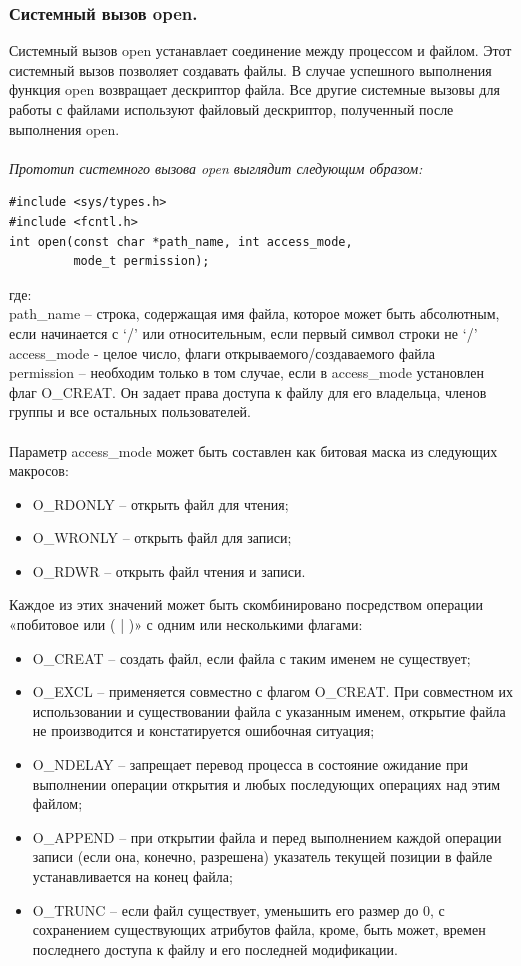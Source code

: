 \documentclass[a4paper]{article}
\begin{document}
\subsubsection{\Large Системный вызов open.}
Системный вызов open устанавлает соединение между процессом и файлом. Этот системный вызов позволяет создавать файлы. В случае успешного выполнения функция open возвращает дескриптор файла. Все другие системные вызовы для работы с файлами используют файловый дескриптор, полученный после выполнения open.\\\\
\sl Прототип системного вызова open выглядит следующим образом:
\begin{verbatim}
#include <sys/types.h>
#include <fcntl.h>
int open(const char *path_name, int access_mode, 
         mode_t permission);
\end{verbatim}
\rm где:\\
path\_name – строка, содержащая имя файла, которое может быть абсолютным, если начинается с ‘/’ или относительным, если первый символ строки
не ‘/’\\
access\_mode - целое число, флаги открываемого/создаваемого файла \\
permission – необходим только в том случае, если в access\_mode установлен флаг O\_CREAT. Он задает права доступа к файлу для его владельца, членов группы и все остальных пользователей.\\\\
Параметр access\_mode может быть составлен как битовая маска из следующих макросов:
\begin{itemize}
  \item O\_RDONLY – открыть файл для чтения;
  \item O\_WRONLY – открыть файл для записи;
  \item O\_RDWR – открыть файл чтения и записи.
\end{itemize}

Каждое из этих значений может быть скомбинировано посредством операции «побитовое или ( | )» с одним или несколькими флагами:
\begin{itemize}
  \item O\_CREAT – создать файл, если файла с таким именем не существует;
  \item O\_EXCL – применяется совместно с флагом O\_CREAT. При совместном их использовании и существовании файла с указанным именем, открытие файла не производится и констатируется ошибочная ситуация;
  \item O\_NDELAY – запрещает перевод процесса в состояние ожидание при выполнении операции открытия и любых последующих операциях над этим файлом;
  \item O\_APPEND – при открытии файла и перед выполнением каждой операции записи (если она, конечно, разрешена) указатель текущей позиции в файле устанавливается на конец файла;
  \item O\_TRUNC – если файл существует, уменьшить его размер до 0, с сохранением существующих атрибутов файла, кроме, быть может, времен последнего доступа к файлу и его последней модификации.
\end{itemize}
\end{document}
